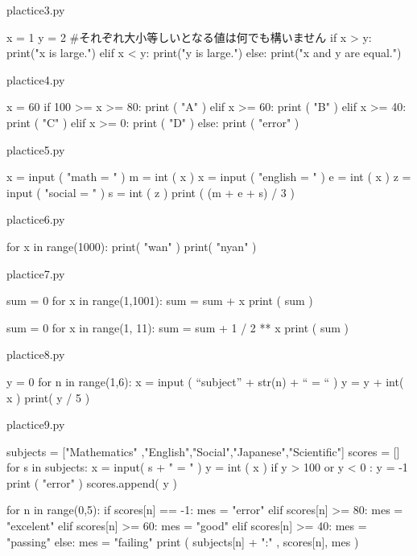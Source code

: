 \documentclass[11pt,a4paper,dvipdfmx,titlepage]{jsreport}
\begin{document}
\begin{ansbox}{plactice3.py}
\begin{listing}{1}
x = 1 
y = 2
#それぞれ大小等しいとなる値は何でも構いません
if x > y:
	print("x is large.")
elif x < y:
	print("y is large.")
else:
	print("x and y are equal.")
\end{listing}
\end{ansbox}

\begin{ansbox}{plactice4.py}
\begin{listing}{1}
x = 60
if 100 >= x >= 80:
    print ( "A" )
elif x >= 60:
    print ( "B" )
elif x >= 40:
    print ( "C" )
elif x >= 0:
    print ( "D" )
else:
    print ( "error" )
\end{listing}
\end{ansbox}



\begin{ansbox}{plactice5.py}
\begin{listing}{1}
x = input ( "math = " )
m = int ( x ) 
x = input ( "english = " )
e = int ( x )
z = input ( "social = " )
s = int ( z )
print ( (m + e + s) / 3 )
\end{listing}
\end{ansbox}

\begin{ansbox}{plactice6.py}
\begin{listing}{1}
for x in range(1000):
    print( "wan" )
    print( "nyan" )
\end{listing}
\end{ansbox}


\begin{ansbox}{plactice7.py}
\begin{listing}{1}
sum = 0
for x in range(1,1001):
    sum = sum + x
print ( sum ) 

sum = 0
for x in range(1, 11):
    sum = sum + 1 / 2 ** x
print ( sum )
\end{listing}
\end{ansbox}

\begin{ansbox}{plactice8.py}
\begin{listing}{1}
y = 0
for n in range(1,6):
    x = input ( “subject” + str(n) + “ = “ )
    y = y + int( x )
print( y / 5 )
\end{listing}
\end{ansbox}

\begin{ansbox}{plactice9.py}
\begin{listing}{1}
subjects = ["Mathematics" ,"English","Social","Japanese","Scientific"]
scores = []
for s in subjects:
    x = input( s + " = " )
    y = int ( x )
    if y > 100 or y < 0 :
        y = -1
        print ( "error" )
    scores.append( y )

for n in range(0,5):
    if scores[n] == -1:
        mes = "error"
    elif scores[n] >= 80:
        mes = "excelent"
    elif scores[n] >= 60:
        mes = "good"
    elif scores[n] >= 40:
        mes = "passing"
    else:
        mes = "failing"
    print ( subjects[n] + ":" , scores[n], mes )
\end{listing}
\end{ansbox}
\end{document}
